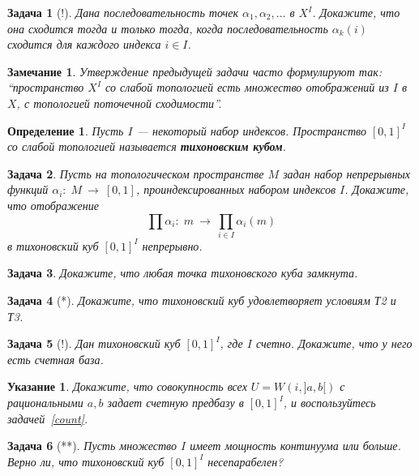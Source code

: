\documentclass[12pt]{book}
\newcommand{\arrow}{{\:\longrightarrow\:}}
\theoremstyle{upshape}
\newtheorem{zadacha}{Задача}[chapter]
\theoremstyle{generic}
\newtheorem{opredelenie}[teorema]{Определение}
\theoremstyle{upshapenonumber}
\newtheorem{ukazanie}{Указание}[section]
\newtheorem{zamechanie}{Замечание}[chapter]
\newcommand{\следствие}{%
     \refstepcounter{teorema}
     {\noindent\bf Следствие \thechapter.\arabic{teorema}:\ }}
\newcommand{\пример}{%
     \refstepcounter{teorema}
     {\noindent\bf Пример \thechapter.\arabic{teorema}:\ }}
\newcommand{\лемма}{%
     \refstepcounter{teorema}
     {\noindent\bf Лемма \thechapter.\arabic{teorema}:\ }}
\newcommand{\теорема}{%
     \refstepcounter{teorema}
     {\noindent\bf Теорема \thechapter.\arabic{teorema}:\ }}
\newcommand{\утверждение}{%
     \refstepcounter{teorema}
     {\noindent\bf Утверждение \thechapter.\arabic{teorema}:\ }}
\begin{document}
{\begin{zadacha}[!]
Дана последовательность точек $\alpha_1, \alpha_2, \dots $ в
$X^I$. Докажите, что она сходится тогда и только тогда, когда
последовательность $\alpha_k(i)$ сходится для каждого индекса $i\in
I$.
\end{zadacha}

\begin{zamechanie}
Утверждение предыдущей задачи часто формулируют так: ``пространство
$X^I$ со слабой топологией есть множество отображений из $I$ в $X$,
с топологией поточечной сходимости''.
\end{zamechanie}

\begin{opredelenie}
Пусть $I$ --- некоторый набор индексов.  Пространство $[0,1]^I$ со
слабой топологией называется {\bf тихоновским кубом}.
\end{opredelenie}

\begin{zadacha} 
Пусть на топологическом пространстве $M$ задан набор непрерывных
функций $\alpha_i:\; M \arrow [0,1]$, проиндексированных набором
индексов $I$.  Докажите, что отображение
\[ 
\prod \alpha_i:\; m \arrow \prod_{i\in I}\alpha_i(m)
\]
в тихоновский куб $[0,1]^I$ непрерывно. 
\end{zadacha}

\begin{zadacha} 
Докажите, что любая точка тихоновского куба замкнута.
\end{zadacha}

\begin{zadacha}[*]
Докажите, что тихоновский куб удовлетворяет условиям Т2 и Т3.
\end{zadacha}

\begin{zadacha}[!]
Дан тихоновский куб $[0,1]^I$, где $I$ счетно.  Докажите, что у него
есть счетная база.
\end{zadacha}

\begin{ukazanie}
Докажите, что совокупность всех $U=W(i, ]a,b[)$ с рациональными
$a,b$ задает счетную предбазу в $[0,1]^I$, и воспользуйтесь
задачей~\ref{count}.
\end{ukazanie}

\begin{zadacha}[**]
 Пусть множество $I$ имеет мощность континуума
 или больше. Верно ли, что тихоновский куб
 $[0,1]^I$ несепарабелен?
\end{zadacha}

}
\end{document}
